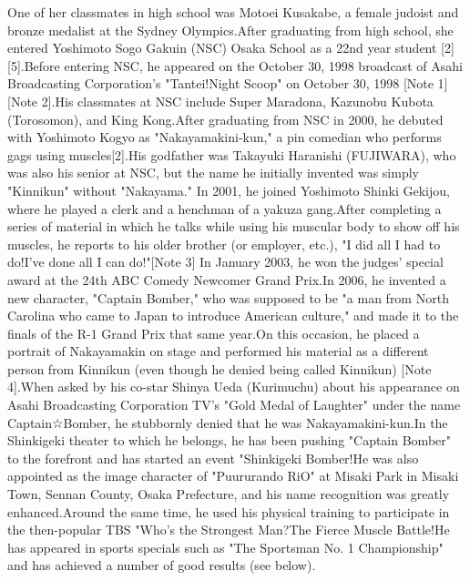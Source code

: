One of her classmates in high school was Motoei Kusakabe, a female judoist and bronze medalist at the Sydney Olympics.After graduating from high school, she entered Yoshimoto Sogo Gakuin (NSC) Osaka School as a 22nd year student [2][5].Before entering NSC, he appeared on the October 30, 1998 broadcast of Asahi Broadcasting Corporation's "Tantei!Night Scoop" on October 30, 1998 [Note 1] [Note 2].His classmates at NSC include Super Maradona, Kazunobu Kubota (Torosomon), and King Kong.After graduating from NSC in 2000, he debuted with Yoshimoto Kogyo as "Nakayamakini-kun," a pin comedian who performs gags using muscles[2].His godfather was Takayuki Haranishi (FUJIWARA), who was also his senior at NSC, but the name he initially invented was simply "Kinnikun" without "Nakayama." In 2001, he joined Yoshimoto Shinki Gekijou, where he played a clerk and a henchman of a yakuza gang.After completing a series of material in which he talks while using his muscular body to show off his muscles, he reports to his older brother (or employer, etc.), "I did all I had to do!I've done all I can do!"[Note 3] In January 2003, he won the judges' special award at the 24th ABC Comedy Newcomer Grand Prix.In 2006, he invented a new character, "Captain Bomber," who was supposed to be "a man from North Carolina who came to Japan to introduce American culture," and made it to the finals of the R-1 Grand Prix that same year.On this occasion, he placed a portrait of Nakayamakin on stage and performed his material as a different person from Kinnikun (even though he denied being called Kinnikun) [Note 4].When asked by his co-star Shinya Ueda (Kurimuchu) about his appearance on Asahi Broadcasting Corporation TV's "Gold Medal of Laughter" under the name Captain☆Bomber, he stubbornly denied that he was Nakayamakini-kun.In the Shinkigeki theater to which he belongs, he has been pushing "Captain Bomber" to the forefront and has started an event "Shinkigeki Bomber!He was also appointed as the image character of "Puururando RiO" at Misaki Park in Misaki Town, Sennan County, Osaka Prefecture, and his name recognition was greatly enhanced.Around the same time, he used his physical training to participate in the then-popular TBS "Who's the Strongest Man?The Fierce Muscle Battle!He has appeared in sports specials such as "The Sportsman No. 1 Championship" and has achieved a number of good results (see below).


\clearpage
\pagestyle{fancy}